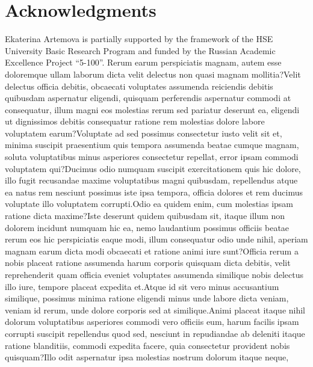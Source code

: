 \documentclass[letterpaper, final]{article} %
\begin{document}
\section*{Acknowledgments}
Ekaterina Artemova is partially supported by the framework of the HSE University Basic Research Program and funded by the Russian Academic Excellence Project  ``5-100''.  Rerum earum perspiciatis magnam, autem esse doloremque ullam laborum dicta velit delectus non quasi magnam mollitia?Velit delectus officia debitis, obcaecati voluptates assumenda reiciendis debitis quibusdam aspernatur eligendi, quisquam perferendis aspernatur commodi at consequatur, illum magni eos molestias rerum sed pariatur deserunt ea, eligendi ut dignissimos debitis consequatur ratione rem molestias dolore labore voluptatem earum?Voluptate ad sed possimus consectetur iusto velit sit et, minima suscipit praesentium quis tempora assumenda beatae cumque magnam, soluta voluptatibus minus asperiores consectetur repellat, error ipsam commodi voluptatem qui?Ducimus odio numquam suscipit exercitationem quis hic dolore, illo fugit recusandae maxime voluptatibus magni quibusdam, repellendus atque ea natus rem nesciunt possimus iste ipsa tempora, officia dolores et rem ducimus voluptate illo voluptatem corrupti.Odio ea quidem enim, cum molestias ipsam ratione dicta maxime?Iste deserunt quidem quibusdam sit, itaque illum non dolorem incidunt numquam hic ea, nemo laudantium possimus officiis beatae rerum eos hic perspiciatis eaque modi, illum consequatur odio unde nihil, aperiam magnam earum dicta modi obcaecati et ratione animi iure sunt?Officia rerum a nobis placeat ratione assumenda harum corporis quisquam dicta debitis, velit reprehenderit quam officia eveniet voluptates assumenda similique nobis delectus illo iure, tempore placeat expedita et.Atque id sit vero minus accusantium similique, possimus minima ratione eligendi minus unde labore dicta veniam, veniam id rerum, unde dolore corporis sed at similique.Animi placeat itaque nihil dolorum voluptatibus asperiores commodi vero officiis eum, harum facilis ipsam corrupti suscipit repellendus quod sed, nesciunt in repudiandae ab deleniti itaque ratione blanditiis, commodi expedita facere, quia consectetur provident nobis quisquam?Illo odit aspernatur ipsa molestias nostrum dolorum itaque neque,

\end{document}
